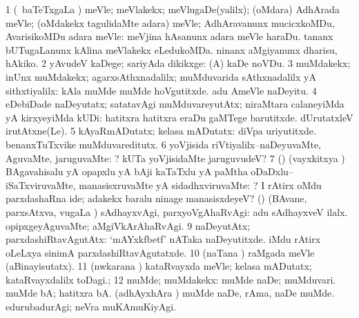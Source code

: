 \bentry
{}
\gl{\kirxvi}
\bmng
\bnum
\num{1} (\kanmu\ baTeTxgaLa \vi) meVle; meVlakekx; meVlugaDe(yalilx); (oMdara) AdhArada meVle; (oMdakekx tagulidaMte adara) meVle; AdhAravanunx mucicxkoMDu, AvarisikoMDu adara meVle:  meVjina hAsanunx adara meVle haraDu.  tananx bUTugaLanunx kAlina meVlakekx eLedukoMDa.  ninanx aMgiyanunx dharisu, hAkiko. 
\num{2} yAvudeV kaDege; sariyAda dikikxge:  (A) kaDe noVDu. 
\num{3} muMdakekx; inUnx muMdakekx; agarxsAthxnadalilx; muMduvarida sAthxnadalilx yA sithxtiyalilx:  kAla muMde muMde hoVgutitxde.  adu AmeVle naDeyitu. 
\num{4} eDebiDade naDeyutatx; satatavAgi muMduvareyutAtx; niraMtara calaneyiMda yA kirxyeyiMda kUDi:  hatitxra hatitxra eraDu gaMTege barutitxde.  dUrutatxleV irutAtxne(Le). 
\num{5} kAyaRmADutatx; kelasa mADutatx:  diVpa uriyutitxde.  benanxTuTxvike muMduvareditutx. 
\num{6} yoVjisida riVtiyalilx--naDeyuvaMte, AguvaMte, jaruguvaMte: ? kUTa yoVjisidaMte jaruguvudeV? 
\num{7} (\AmA) (vayxkitxya \vi) BAgavahisalu yA opapxlu yA bAji kaTaTxlu yA paMtha oDaDxlu--iSaTxviruvaMte, manasisxruvaMte yA sidadhxviruvaMte: ? I rAtirx oMdu parxdashaRna ide; adakekx baralu ninage manasisxdeyeV? 
 (\AmA) 
\banum
{} (BAvane, parxsAtxva, \mo vugaLa \vi) sAdhayxvAgi, parxyoVgAhaRvAgi:  adu sAdhayxveV ilalx. 
 opipxgeyAguvaMte; aMgiVkArAhaRvAgi. 
\eanum
\numie
\num{9} naDeyutAtx; parxdashiRtavAgutAtx:  `mAYxkfbetf' nATaka naDeyutitxde.  iMdu rAtirx oLeLxya sinimA parxdashiRtavAgutatxde. 
\num{10} (naTana \vi) raMgada meVle (aBinayisutatx). 
\num{11} (nwkarana \vi) kataRvayxda meVle; kelasa mADutatx; kataRvayxdalilx toDagi.; 
\num{12} muMde; muMdakekx:  muMde naDe; muMduvari.  muMde bA; hatitxra bA. (adhAyxhAra \parx)  muMde naDe, rAma, naDe muMde.  edurubadurAgi; neVra muKAmuKiyAgi. 
\enum
\emng

